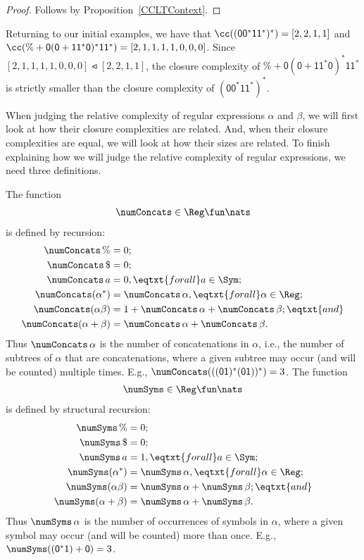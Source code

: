 \begin{proof}
Follows by Proposition~\ref{CCLTContext}.
\end{proof}

Returning to our initial examples, we have that
$\cc(\mathsf{(00^*11^*)^*}) = [2,2,1,1]$ and $\cc(\% + \mathsf{0(0 +
  11^*0)^*11^*}) = [2,1,1,1,1,0,0,0]$.  Since
$[2,1,1,1,1,0,0,0]\ltcc[2,2,1,1]$, the closure
complexity of $\% + \mathsf{0(0 + 11^*0)^*11^*}$ is strictly smaller
than the closure complexity of $\mathsf{(00^*11^*)^*}$.

When judging the relative complexity of regular expressions $\alpha$
and $\beta$, we will first look at how their closure complexities are
related.  And, when their closure complexities are equal, we will
look at how their sizes are related.  To finish explaining how
we will judge the relative complexity of regular expressions, we
need three definitions.

The function
%
%
%
\begin{gather*}
\numConcats\in\Reg\fun\nats
\end{gather*}
is defined by recursion:
\begin{align*}
\numConcats\,\% &= 0 ; \\
\numConcats\,\$ &= 0 ; \\
\numConcats\,a &= 0, \eqtxt{for all}a\in\Sym ; \\
\numConcats(\alpha^*) &= \numConcats\,\alpha , \eqtxt{for all} \alpha\in\Reg ; \\
\numConcats(\alpha\beta) &= 1 + \numConcats\,\alpha + \numConcats\,\beta ;
\eqtxt{and}\\
\numConcats(\alpha + \beta) &= \numConcats\,\alpha + \numConcats\,\beta .
\end{align*}
Thus $\numConcats\,\alpha$ is the number of concatenations in $\alpha$,
i.e., the number of subtrees of $\alpha$ that are concatenations,
where a given subtree may occur (and will be counted) multiple times.
E.g., $\numConcats(\mathsf{((01)^*(01))^*}) = 3$.
The function
%
%
%
\begin{gather*}
\numSyms\in\Reg\fun\nats
\end{gather*}
is defined by structural recursion:
\begin{align*}
\numSyms\,\% &= 0 ; \\
\numSyms\,\$ &= 0 ; \\
\numSyms\,a &= 1, \eqtxt{for all}a\in\Sym ; \\
\numSyms(\alpha^*) &= \numSyms\,\alpha , \eqtxt{for all} \alpha\in\Reg ; \\
\numSyms(\alpha\beta) &= \numSyms\,\alpha + \numSyms\,\beta ; \eqtxt{and}\\
\numSyms(\alpha + \beta) &= \numSyms\,\alpha + \numSyms\,\beta .
\end{align*}
Thus $\numSyms\,\alpha$ is the number of occurrences of symbols in $\alpha$,
where a given symbol may occur (and will be counted) more than once.
E.g., $\numSyms(\mathsf{(0^*1)+0}) = 3$.

